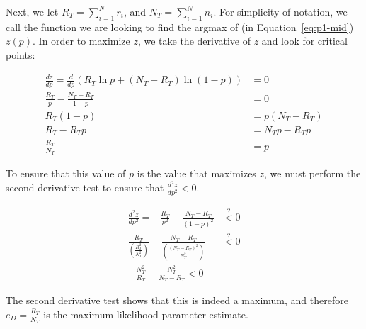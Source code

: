 \documentclass[fleqn]{homework}
\begin{document}
\begin{problem}{1}
    Next, we let $R_T = \sum_{i=1}^{N} r_i$, and $N_T = \sum_{i=1}^N n_i$.  For
    simplicity of notation, we call the function we are looking to find the
    argmax of (in Equation~\ref{eq:p1-mid}) $z(p)$.  In order to maximize $z$,
    we take the derivative of $z$ and look for critical points:

    \begin{align}
      \frac{dz}{dp} = \frac{d}{dp} \left( R_T \ln p + (N_T-R_T)\ln(1-p) \right)
      &= 0 \\
      \frac{R_T}{p} - \frac{N_T-R_T}{1-p} &= 0 \\
      R_T(1-p) &= p(N_T - R_T) \\
      R_T - R_T p &= N_T p - R_T p \\
      \frac{R_T}{N_T} &= p
    \end{align}

    To ensure that this value of $p$ is the value that maximizes $z$, we must
    perform the second derivative test to ensure that $\frac{d^2z}{dp^2} < 0$.

    \begin{align}
      \frac{d^2z}{dp^2} = -\frac{R_T}{p^2} - \frac{N_T - R_T}{(1-p)^2}
      &\overset{?}{<} 0 \\
      \frac{R_T}{\left(\frac{R_T^2}{N_T^2}\right)} - \frac{N_T -
      R_T}{\left(\frac{(N_T-R_T)^2}{N_T^2}\right)} &\overset{?}{<} 0 \\
      -\frac{N_T^2}{R_T} - \frac{N_T^2}{N_T-R_T} < 0
    \end{align}

    The second derivative test shows that this is indeed a maximum, and
    therefore $e_D = \frac{R_T}{N_T}$ is the maximum likelihood parameter
    estimate.
  \end{problem}
\end{document}
